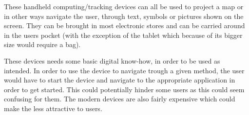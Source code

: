These handheld computing/tracking devices can all be used to project a map or in other ways navigate the user, through text, symbols or pictures shown on the screen. They can be brought in most electronic stores and can be carried around in the users pocket (with the exception of the tablet which because of its bigger size would require a bag). 

These devices needs some basic digital know-how, in order to be used as intended. In order to use the device to navigate trough a given method, the user would have to start the device and navigate to the appropriate application in order to get started. This could potentially hinder some users as this could seem confusing for them. The modern devices are also fairly expensive which could make the less attractive to users. 